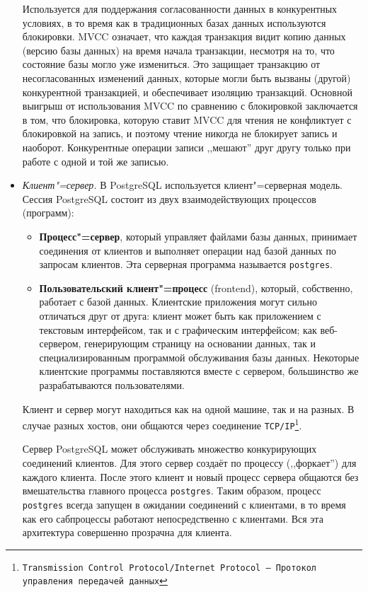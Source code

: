 \documentclass[a4paper,12pt,notitlepage,headsepline,pdftex]{scrartcl}
\begin{document}
\begin{itemize}
      Используется для поддержания согласованности данных в конкурентных
      условиях, в то время как в традиционных базах данных используются
      блокировки.
      MVCC означает, что каждая транзакция видит копию данных (версию базы
      данных) на время начала транзакции, несмотря на то, что состояние базы
      могло уже измениться.
      Это защищает транзакцию от несогласованных изменений данных, которые
      могли быть вызваны (другой) конкурентной транзакцией, и обеспечивает
      изоляцию транзакций.
      Основной выигрыш от использования MVCC по сравнению с блокировкой
      заключается в том, что блокировка, которую ставит MVCC для чтения не
      конфликтует с блокировкой на запись, и поэтому чтение никогда не
      блокирует запись и наоборот.
      Конкурентные операции записи ,,мешают'' друг другу только при работе с
      одной и той же записью.
    \item \emph{Клиент"=сервер.}
      В PostgreSQL используется клиент"=серверная модель.
      Сессия PostgreSQL состоит из двух взаимодействующих процессов (программ):
      \begin{itemize}
        \item \textbf{Процесс"=сервер}, который управляет файлами базы данных,
          принимает соединения от клиентов и выполняет операции над базой
          данных по запросам клиентов.
          Эта серверная программа называется \texttt{postgres}.
        \item \textbf{Пользовательский клиент"=процесс} (frontend), который,
          собственно, работает с базой данных.
          Клиентские приложения могут сильно отличаться друг от друга:
          клиент может быть как приложением с текстовым интерфейсом, так и с
          графическим интерфейсом;
          как веб-сервером, генерирующим страницу на основании данных, так и
          специализированным программой обслуживания базы данных.
          Некоторые клиентские программы поставляются вместе с сервером,
          большинство же разрабатываются пользователями.
      \end{itemize}

      Клиент и сервер могут находиться как на одной машине, так и на разных.
      В случае разных хостов, они общаются через соединение
      \texttt{TCP/IP\footnote{Transmission Control Protocol/Internet Protocol
      --- Протокол управления передачей данных}}.

      Сервер PostgreSQL может обслуживать множество конкурирующих соединений
      клиентов.
      Для этого сервер создаёт по процессу (,,форкает'') для каждого клиента.
      После этого клиент и новый процесс сервера общаются без вмешательства
      главного процесса \texttt{postgres}.
      Таким образом, процесс \texttt{postgres} всегда запущен в ожидании
      соединений с клиентами, в то время как его сабпроцессы работают
      непосредственно с клиентами.
      Вся эта архитектура совершенно прозрачна для клиента.\cite{ofdoc}


\end{itemize}
\end{document}
